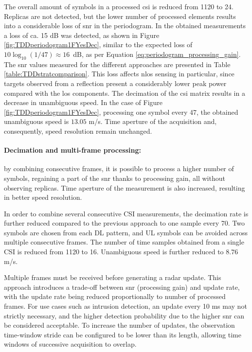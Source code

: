 		     The overall amount of symbols in a processed \gls{csi} is reduced from 1120 to 24.
		     Replicas are not detected, but the lower number of processed elements results into a considerable loss of \gls{snr} in the periodogram. In the obtained measurements a loss of ca. 15 dB was detected, as shown in Figure \ref{fig:TDDperiodogram1FYesDec}, similar to the expected loss of $10\log_{10}(1/47) \approx 16$~dB, as per Equation \ref{eq:periodogram_processing_gain}.
		     The \gls{snr} values measured for the different approaches are presented in Table \ref{table:TDDstratcomparison}. 
		     This loss affects \gls{nlos} sensing in particular, since targets observed from a reflection present a considerably lower peak power compared with the \gls{los} components.
		     The decimation of the \gls{csi} matrix results in a decrease in unambiguous speed. In the case of Figure \ref{fig:TDDperiodogram1FYesDec}, processing one symbol every 47, the obtained unambiguous speed is $13.05$ m/s. Time aperture of the acquisition and, consequently, speed resolution remain unchanged.
		    
		     \paragraph{Decimation and multi-frame processing:}
		     by combining consecutive frames, it is possible to process a higher number of symbols, regaining a part of the \gls{snr} thanks to processing gain, all without observing replicas. 
		     Time aperture of the measurement is also increased, resulting in better speed resolution.
		     
			 In order to combine several consecutive CSI measurements, the decimation rate is further reduced compared to the previous approach to one sample every 70. 
			 Two symbols are chosen from each DL pattern, and UL symbols can be avoided across multiple consecutive frames.
			 The number of time samples obtained from a single CSI is reduced from 1120 to 16.
			 Unambiguous speed is further reduced to $8.76$ m/s.
			 
			 Multiple frames must be received before generating a radar update.
			 This approach introduces a trade-off between \gls{snr} (processing gain) and update rate, with the update rate being reduced proportionally to number of processed frames.
		     For use cases such as intrusion detection, an update every 10 ms may not strictly necessary, and the higher detection probability due to the higher \gls{snr} can be considered acceptable.
		     To increase the number of updates, the observation time-window stride can be configured to be lower than its length, allowing time windows of successive acquisition to overlap.
		      
